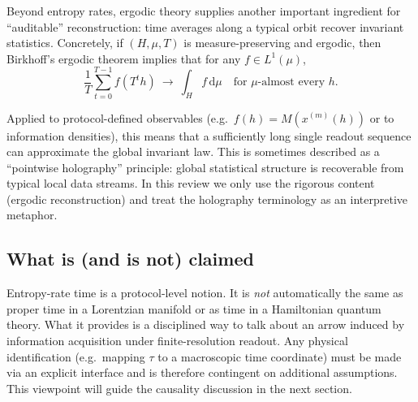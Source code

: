 Beyond entropy rates, ergodic theory supplies another important ingredient for ``auditable'' reconstruction: time averages along a typical orbit recover invariant statistics. Concretely, if $(H,\mu,T)$ is measure-preserving and ergodic, then Birkhoff's ergodic theorem implies that for any $f\in L^1(\mu)$,
\[
\frac{1}{T}\sum_{t=0}^{T-1} f(T^t h)\ \longrightarrow\ \int_H f\,\mathrm{d}\mu
\quad\text{for }\mu\text{-almost every }h.
\]
\cite{Walters1982,Petersen1983}

Applied to protocol-defined observables (e.g.\ $f(h)=M(x^{(m)}(h))$ or to information densities), this means that a sufficiently long single readout sequence can approximate the global invariant law. This is sometimes described as a ``pointwise holography'' principle: global statistical structure is recoverable from typical local data streams. In this review we only use the rigorous content (ergodic reconstruction) and treat the holography terminology as an interpretive metaphor.

\subsection{What is (and is not) claimed}\label{sec:info-time:limits}

Entropy-rate time is a protocol-level notion. It is \emph{not} automatically the same as proper time in a Lorentzian manifold or as time in a Hamiltonian quantum theory. What it provides is a disciplined way to talk about an arrow induced by information acquisition under finite-resolution readout. Any physical identification (e.g.\ mapping $\tau$ to a macroscopic time coordinate) must be made via an explicit interface and is therefore contingent on additional assumptions. This viewpoint will guide the causality discussion in the next section.

